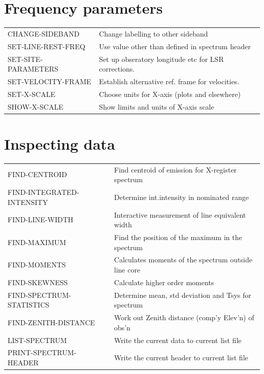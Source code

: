 \documentclass[11pt,twoside]{report}
\begin{document}
\section{Frequency parameters} 

\begin{tabular}{ll}
CHANGE-SIDEBAND        & Change labelling to other sideband\\
SET-LINE-REST-FREQ     & Use value other than defined in spectrum header\\
SET-SITE-PARAMETERS    & Set up obseratory longitude etc for LSR corrections.\\
SET-VELOCITY-FRAME     & Establish alternative ref. frame for velocities.\\
SET-X-SCALE            & Choose units for X-axis (plots and elsewhere)\\
SHOW-X-SCALE           & Show limits and units of X-axis scale\\
\end{tabular}

\section{Inspecting data} 

\begin{tabular}{ll}
FIND-CENTROID          & Find centroid of emission for X-register spectrum\\
FIND-INTEGRATED-INTENSITY  & Determine int.intensity in nominated range\\
FIND-LINE-WIDTH        & Interactive measurement of line equivalent width \\
FIND-MAXIMUM           & Find the position of the maximum in the spectrum\\
FIND-MOMENTS           & Calculates moments of the spectrum outside line core\\
FIND-SKEWNESS          & Calculate higher order moments\\
FIND-SPECTRUM-STATISTICS   & Determine mean, std deviation and Tsys for spectrum\\
FIND-ZENITH-DISTANCE   & Work out Zenith distance (comp'y Elev'n) of obs'n\\
LIST-SPECTRUM          & Write the current data to current list file\\
PRINT-SPECTRUM-HEADER  & Write the current header to current list file\\
\end{tabular}
\end{document}
